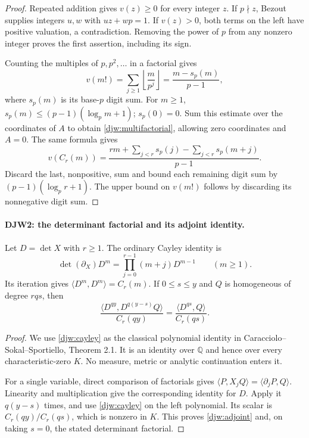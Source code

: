 \documentclass[11pt,a4paper]{article}
\numberwithin{equation}{section}
\theoremstyle{remark}\newtheorem{remark}[theorem]{Remark}
\begin{document}
\begin{proof}
Repeated addition gives $v(z)\ge0$ for every integer $z$.
If $p\nmid z$, Bezout supplies integers $u,w$ with $uz+wp=1$.
If $v(z)>0$, both terms on the left have positive valuation, a
contradiction.  Removing the power of $p$ from any nonzero integer
proves the first assertion, including its sign.

Counting the multiples of $p,p^2,\ldots$ in a factorial gives
\[
 v(m!)=\sum_{j\ge1}\left\lfloor\frac m{p^j}\right\rfloor
       =\frac{m-s_p(m)}{p-1},
\]
where $s_p(m)$ is its base-$p$ digit sum.  For $m\ge1$,
$s_p(m)\le(p-1)(\log_p m+1)$; $s_p(0)=0$.
Sum this estimate over the coordinates of $A$ to obtain
\eqref{djw:multifactorial}, allowing zero coordinates and $A=0$.
The same formula gives
\[
 v(C_r(m))=
 \frac{rm+\sum_{j<r}s_p(j)-\sum_{j<r}s_p(m+j)}{p-1}.
\]
Discard the last, nonpositive, sum and bound each remaining digit
sum by $(p-1)(\log_p r+1)$.  The upper bound on $v(m!)$ follows
by discarding its nonnegative digit sum.
\end{proof}

\paragraph{DJW2: the determinant factorial and its adjoint identity.}
\label{claim:DJW2}
Let $D=\det X$ with $r\ge1$.  The ordinary Cayley identity is
\begin{equation}
 \det(\partial_X)D^m=
       \prod_{j=0}^{r-1}(m+j)D^{m-1}\qquad(m\ge1).
 \label{djw:cayley}
\end{equation}
Its iteration gives
$\langle D^m,D^m\rangle=C_r(m)$.
If $0\le s\le y$ and $Q$ is homogeneous of degree $rqs$, then
\begin{equation}
 \frac{\langle D^{qy},D^{q(y-s)}Q\rangle}{C_r(qy)}
       =\frac{\langle D^{qs},Q\rangle}{C_r(qs)}.
 \label{djw:adjoint}
\end{equation}

\begin{proof}
We use \eqref{djw:cayley} as the classical polynomial identity in
Caracciolo--Sokal--Sportiello, Theorem 2.1.  It is an identity over
$\mathbb Q$ and hence over every characteristic-zero $K$.
No measure, metric or analytic continuation enters it.

For a single variable, direct comparison of factorials gives
$\langle P,X_jQ\rangle=\langle\partial_jP,Q\rangle$.
Linearity and multiplication give the corresponding identity for
$D$.  Apply it $q(y-s)$ times, and use \eqref{djw:cayley} on the
left polynomial.  Its scalar is $C_r(qy)/C_r(qs)$, which is nonzero
in $K$.  This proves \eqref{djw:adjoint} and, on taking $s=0$,
the stated determinant factorial.
\end{proof}
\end{document}
